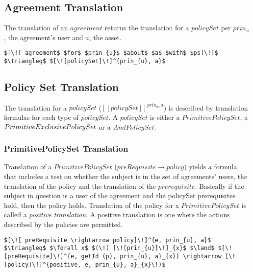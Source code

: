 \subsection{Agreement Translation}
The translation of an $agreement$ returns the translation for a $policySet$ per $prin_{u}$, the agreement's user and $a$, the asset.


\lstset{mathescape, language=AST}  
\begin{lstlisting}[frame=single, caption={Agreement Translation},label={lst:transAgreementast}]
$[\![ agreement$ $for$ $prin_{u}$ $about$ $a$ $with$ $ps]\!]$ $\triangleq$ $[\![policySet]\!]^{prin_{u}, a}$
\end{lstlisting}

\subsection{Policy Set Translation}
The translation for a $policySet$ ($[\![policySet]\!]^{prin_{u}, a}$) is described by translation formulas for each type of $policySet$. A $policySet$ is either a $PrimitivePolicySet$, a $\linebreak PrimitiveExclusivePolicySet$ or a $AndPolicySet$.

\subsubsection{PrimitivePolicySet Translation}
Translation of a $PrimitivePolicySet$ ($preRequisite \rightarrow policy$) yields a formula that includes a test on whether the subject is in the set of agreements' users, the translation of the policy and the translation of the $prerequisite$. Basically if the subject in question is a user of the agreement and the policySet prerequisites hold, then the policy holds. Translation of the policy for a $PrimitivePolicySet$ is called a \emph{positive translation}. A positive translation is one where the actions described by the policies are permitted.   

\lstset{mathescape, language=AST}  
\begin{lstlisting}[frame=single, caption={Policy Set Translation {$\colon$} PrimitivePolicySet},label={lst:transpolicyformulaPrimitivePolicySet}]
$[\![ preRequisite \rightarrow policy]\!]^{e, prin_{u}, a}$ $\triangleq$ $\forall x$ $(\!( [\![prin_{u}]\!]_{x}$ $\land$ $[\![preRequisite]\!]^{e, getId (p), prin_{u}, a}_{x}) \rightarrow [\![policy]\!]^{positive, e, prin_{u}, a}_{x}\!)$
\end{lstlisting}



